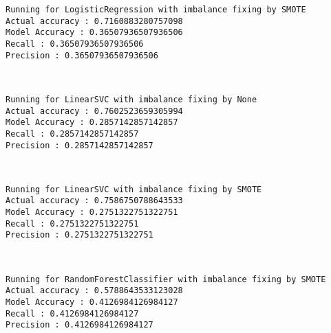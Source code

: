 \documentclass[11pt]{article}
\begin{document}
    \begin{Verbatim}[commandchars=\\\{\}]
Running for LogisticRegression with imbalance fixing by SMOTE
Actual accuracy : 0.7160883280757098
Model Accuracy : 0.36507936507936506
Recall : 0.36507936507936506
Precision : 0.36507936507936506

    \end{Verbatim}

    \begin{center}
    \end{center}
    { \hspace*{\fill} \\}
    
    \begin{Verbatim}[commandchars=\\\{\}]
Running for LinearSVC with imbalance fixing by None
Actual accuracy : 0.7602523659305994
Model Accuracy : 0.2857142857142857
Recall : 0.2857142857142857
Precision : 0.2857142857142857

    \end{Verbatim}

    \begin{center}
    \end{center}
    { \hspace*{\fill} \\}
    
    \begin{Verbatim}[commandchars=\\\{\}]
Running for LinearSVC with imbalance fixing by SMOTE
Actual accuracy : 0.7586750788643533
Model Accuracy : 0.2751322751322751
Recall : 0.2751322751322751
Precision : 0.2751322751322751

    \end{Verbatim}

    \begin{center}
    \end{center}
    { \hspace*{\fill} \\}
    
    \begin{Verbatim}[commandchars=\\\{\}]
Running for RandomForestClassifier with imbalance fixing by SMOTE
Actual accuracy : 0.5788643533123028
Model Accuracy : 0.4126984126984127
Recall : 0.4126984126984127
Precision : 0.4126984126984127

    \end{Verbatim}
\end{document}
